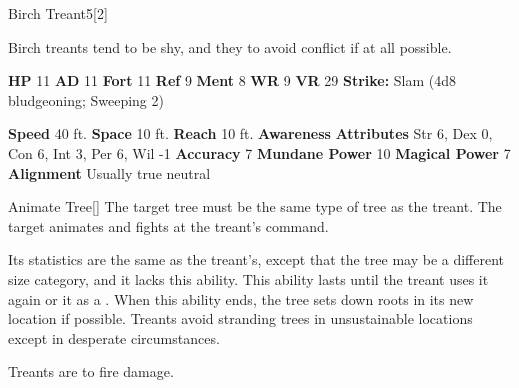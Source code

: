       
  \begin{monsubsection}{Birch Treant}{5}[2]
    \vspace{-1em}\vspace{-1em}
    \vspace{0em}

    
          Birch treants tend to be shy, and they to avoid conflict if at all possible.
        

    \begin{spellcontent}
      \begin{spelltargetinginfo}
        \pari \textbf{HP} 11 \monsep
          \textbf{AD} 11 \monsep
          \textbf{Fort} 11 \monsep
          \textbf{Ref} 9 \monsep
          \textbf{Ment} 8
        \pari \textbf{WR} 9 \monsep
        \textbf{VR} 29
        \pari \textbf{Strike:}
            Slam  (4d8 bludgeoning; Sweeping 2)
      \end{spelltargetinginfo}
    \end{spellcontent}
    \begin{monsterfooter}
      \pari \textbf{Speed} 40 ft. \monsep
        \textbf{Space} 10 ft. \monsep
        \textbf{Reach} 10 ft.
      \pari \textbf{Awareness} 
      \pari \textbf{Attributes}
        Str 6, Dex 0,
        Con 6, Int 3,
        Per 6, Wil -1
      \pari \textbf{Accuracy} 7 \monsep
        \textbf{Mundane Power} 10 \monsep
      \textbf{Magical Power} 7
      \pari \textbf{Alignment} Usually true neutral
    \end{monsterfooter}
  \end{monsubsection}
  \begin{freeability}{Animate Tree}[]
      The target tree must be the same type of tree as the treant.
        The target animates and fights at the treant's command.

        Its statistics are the same as the treant's, except that the tree may be a different size category, and it lacks this ability.
        This ability lasts until the treant uses it again or  it as a .
        When this ability ends, the tree sets down roots in its new location if possible.
        Treants avoid stranding trees in unsustainable locations except in desperate circumstances.
    \end{freeability}
  
        Treants are  to fire damage.
      
